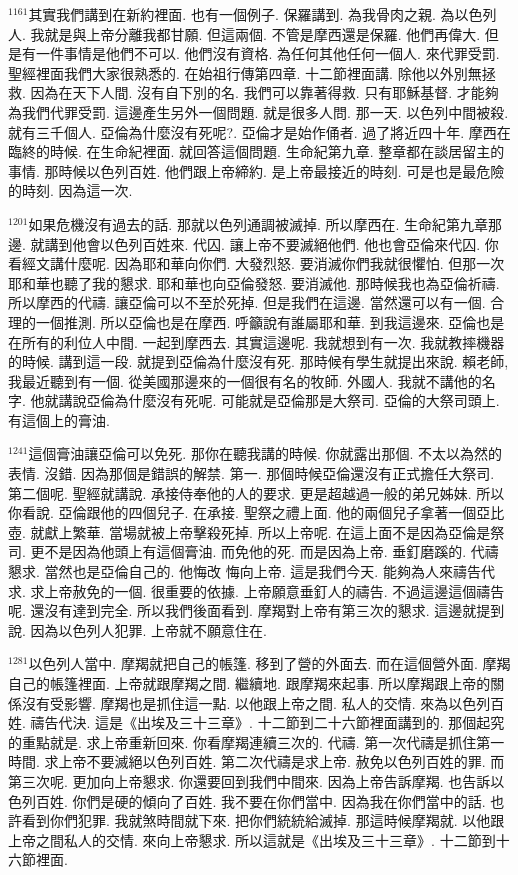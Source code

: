 \documentclass{book}
\begin{document}
$^{1161}$其實我們講到在新約裡面.
也有一個例子.
保羅講到.
為我骨肉之親.
為以色列人.
我就是與上帝分離我都甘願.
但這兩個.
不管是摩西還是保羅.
他們再偉大.
但是有一件事情是他們不可以.
他們沒有資格.
為任何其他任何一個人.
來代罪受罰.
聖經裡面我們大家很熟悉的.
在始祖行傳第四章.
十二節裡面講.
除他以外別無拯救.
因為在天下人間.
沒有自下別的名.
我們可以靠著得救.
只有耶穌基督.
才能夠為我們代罪受罰.
這邊產生另外一個問題.
就是很多人問.
那一天.
以色列中間被殺.
就有三千個人.
亞倫為什麼沒有死呢?.
亞倫才是始作俑者.
過了將近四十年.
摩西在臨終的時候.
在生命紀裡面.
就回答這個問題.
生命紀第九章.
整章都在談居留主的事情.
那時候以色列百姓.
他們跟上帝締約.
是上帝最接近的時刻.
可是也是最危險的時刻.
因為這一次.

$^{1201}$如果危機沒有過去的話.
那就以色列通調被滅掉.
所以摩西在.
生命紀第九章那邊.
就講到他會以色列百姓來.
代囚.
讓上帝不要滅絕他們.
他也會亞倫來代囚.
你看經文講什麼呢.
因為耶和華向你們.
大發烈怒.
要消滅你們我就很懼怕.
但那一次耶和華也聽了我的懇求.
耶和華也向亞倫發怒.
要消滅他.
那時候我也為亞倫祈禱.
所以摩西的代禱.
讓亞倫可以不至於死掉.
但是我們在這邊.
當然還可以有一個.
合理的一個推測.
所以亞倫也是在摩西.
呼籲說有誰屬耶和華.
到我這邊來.
亞倫也是在所有的利位人中間.
一起到摩西去.
其實這邊呢.
我就想到有一次.
我就教摔機器的時候.
講到這一段.
就提到亞倫為什麼沒有死.
那時候有學生就提出來說.
賴老師,我最近聽到有一個.
從美國那邊來的一個很有名的牧師.
外國人.
我就不講他的名字.
他就講說亞倫為什麼沒有死呢.
可能就是亞倫那是大祭司.
亞倫的大祭司頭上.
有這個上的膏油.

$^{1241}$這個膏油讓亞倫可以免死.
那你在聽我講的時候.
你就露出那個.
不太以為然的表情.
沒錯.
因為那個是錯誤的解禁.
第一.
那個時候亞倫還沒有正式擔任大祭司.
第二個呢.
聖經就講說.
承接侍奉他的人的要求.
更是超越過一般的弟兄姊妹.
所以你看說.
亞倫跟他的四個兒子.
在承接.
聖祭之禮上面.
他的兩個兒子拿著一個亞比壺.
就獻上繁華.
當場就被上帝擊殺死掉.
所以上帝呢.
在這上面不是因為亞倫是祭司.
更不是因為他頭上有這個膏油.
而免他的死.
而是因為上帝.
垂釘磨蹊的.
代禱懇求.
當然也是亞倫自己的.
他悔改 悔向上帝.
這是我們今天.
能夠為人來禱告代求.
求上帝赦免的一個.
很重要的依據.
上帝願意垂釘人的禱告.
不過這邊這個禱告呢.
還沒有達到完全.
所以我們後面看到.
摩羯對上帝有第三次的懇求.
這邊就提到說.
因為以色列人犯罪.
上帝就不願意住在.

$^{1281}$以色列人當中.
摩羯就把自己的帳篷.
移到了營的外面去.
而在這個營外面.
摩羯自己的帳篷裡面.
上帝就跟摩羯之間.
繼續地.
跟摩羯來起事.
所以摩羯跟上帝的關係沒有受影響.
摩羯也是抓住這一點.
以他跟上帝之間.
私人的交情.
來為以色列百姓.
禱告代決.
這是《出埃及三十三章》.
十二節到二十六節裡面講到的.
那個起究的重點就是.
求上帝重新回來.
你看摩羯連續三次的.
代禱.
第一次代禱是抓住第一時間.
求上帝不要滅絕以色列百姓.
第二次代禱是求上帝.
赦免以色列百姓的罪.
而第三次呢.
更加向上帝懇求.
你還要回到我們中間來.
因為上帝告訴摩羯.
也告訴以色列百姓.
你們是硬的傾向了百姓.
我不要在你們當中.
因為我在你們當中的話.
也許看到你們犯罪.
我就煞時間就下來.
把你們統統給滅掉.
那這時候摩羯就.
以他跟上帝之間私人的交情.
來向上帝懇求.
所以這就是《出埃及三十三章》.
十二節到十六節裡面.
\end{document}
